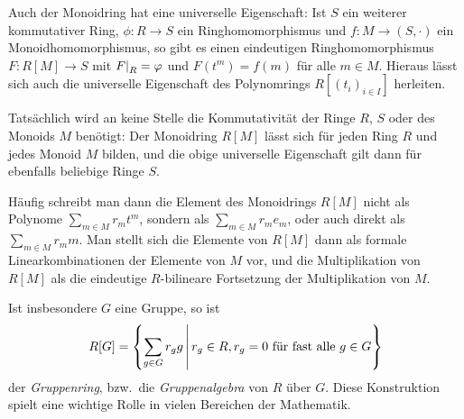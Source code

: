 Auch der Monoidring hat eine universelle Eigenschaft:
Ist $S$ ein weiterer kommutativer Ring, $\phi \colon R \to S$ ein Ringhomomorphismus und $f \colon M \to (S, \cdot)$ ein Monoidhomomorphismus, so gibt es einen eindeutigen Ringhomomorphismus $F \colon R[M] \to S$ mit $\restrict{F}{R} = \varphi$ und $F(t^m) = f(m)$ für alle $m \in M$.
Hieraus lässt sich auch die universelle Eigenschaft des Polynomrings $R[(t_i)_{i \in I}]$ herleiten.

\begin{remark}
  Tatsächlich wird an keine Stelle die Kommutativität der Ringe $R$, $S$ oder des Monoids $M$ benötigt:
  Der Monoidring $R[M]$ lässt sich für jeden Ring $R$ und jedes Monoid $M$ bilden, und die obige universelle Eigenschaft gilt dann für ebenfalls beliebige Ringe $S$.
  
  Häufig schreibt man dann die Element des Monoidrings $R[M]$ nicht als Polynome $\sum_{m \in M} r_m t^m$, sondern als $\sum_{m \in M} r_m e_m$, oder auch direkt als $\sum_{m \in M} r_m m$.
  Man stellt sich die Elemente von $R[M]$ dann als formale Linearkombinationen der Elemente von $M$ vor, und die Multiplikation von $R[M]$ als die eindeutige $R$-bilineare Fortsetzung der Multiplikation von $M$.
  
  Ist insbesondere $G$ eine Gruppe, so ist
  \[
      R[G]
    = \left\{
        \sum_{g \in G} r_g g
      \suchthat*
        r_g \in R,
        \text{$r_g = 0$ für fast alle $g \in G$}
      \right\}
  \]
  der \emph{Gruppenring}, bzw.\ die \emph{Gruppenalgebra} von $R$ über $G$.
  Diese Konstruktion spielt eine wichtige Rolle in vielen Bereichen der Mathematik.
\end{remark}






